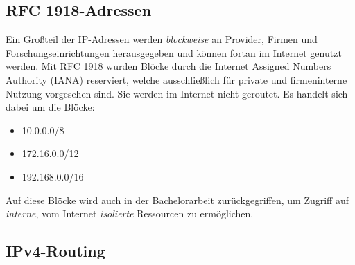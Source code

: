 \subsection{RFC 1918-Adressen}
Ein Großteil der IP-Adressen werden \textit{blockweise} an Provider, Firmen und Forschungseinrichtungen herausgegeben und können fortan im Internet genutzt werden. Mit RFC 1918 wurden Blöcke durch die Internet Assigned Numbers Authority (IANA) reserviert, welche ausschließlich für private und firmeninterne Nutzung vorgesehen sind\cite{rfc1918}. Sie werden im Internet nicht geroutet. Es handelt sich dabei um die Blöcke:
\begin{itemize}
\item 10.0.0.0/8
\item 172.16.0.0/12
\item 192.168.0.0/16
\end{itemize}

Auf diese Blöcke wird auch in der Bachelorarbeit zurückgegriffen, um Zugriff auf \textit{interne}, vom Internet \textit{isolierte} Ressourcen zu ermöglichen.

\subsection{IPv4-Routing}

